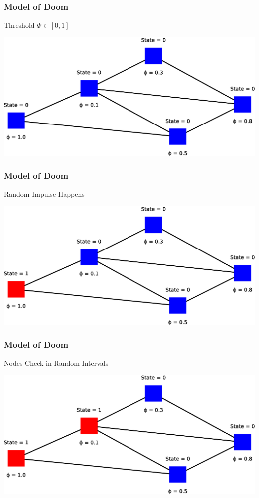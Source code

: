 \begin{frame}
    \frametitle{Model of Doom}
    \begin{itemize}
        \gitem Threshold $\Phi \in [0, 1]$
    \end{itemize}
    \vfill
    \includegraphics[width=\textwidth]{img/model4}
    \vfill
\end{frame}

\begin{frame}
    \frametitle{Model of Doom}
    \begin{itemize}
        \gitem Random Impulse Happens
    \end{itemize}
    \vfill
    \includegraphics[width=\textwidth]{img/model5}
    \vfill
\end{frame}

\begin{frame}
    \frametitle{Model of Doom}
    \begin{itemize}
        \gitem Nodes Check in Random Intervals
    \end{itemize}
    \vfill
    \includegraphics[width=\textwidth]{img/model6}
    \vfill
\end{frame}

